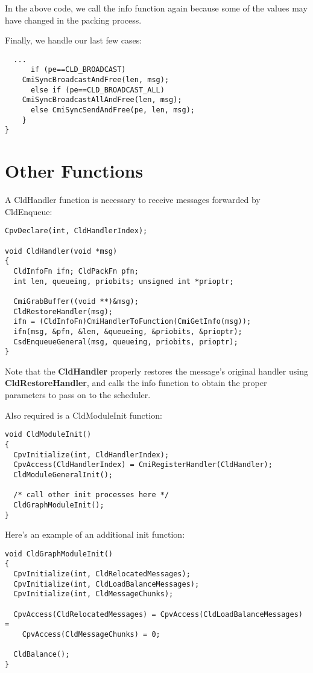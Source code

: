 \documentclass[11pt]{article}
\begin{document}
In the above code, we call the info function again because some of the
values may have changed in the packing process.  

Finally, we handle our last few cases:

\begin{verbatim}
  ...
      if (pe==CLD_BROADCAST) 
	CmiSyncBroadcastAndFree(len, msg);
      else if (pe==CLD_BROADCAST_ALL)
	CmiSyncBroadcastAllAndFree(len, msg);
      else CmiSyncSendAndFree(pe, len, msg);
    }
}
\end{verbatim}

\section{Other Functions}

A CldHandler function is necessary to receive messages forwarded by
CldEnqueue:

\begin{verbatim}
CpvDeclare(int, CldHandlerIndex);

void CldHandler(void *msg)
{
  CldInfoFn ifn; CldPackFn pfn;
  int len, queueing, priobits; unsigned int *prioptr;
  
  CmiGrabBuffer((void **)&msg);
  CldRestoreHandler(msg);
  ifn = (CldInfoFn)CmiHandlerToFunction(CmiGetInfo(msg));
  ifn(msg, &pfn, &len, &queueing, &priobits, &prioptr);
  CsdEnqueueGeneral(msg, queueing, priobits, prioptr);
}
\end{verbatim}

Note that the {\bf CldHandler} properly restores the message's original
handler using {\bf CldRestoreHandler}, and calls the info function to obtain
the proper parameters to pass on to the scheduler.

Also required is a CldModuleInit function:

\begin{verbatim}
void CldModuleInit()
{
  CpvInitialize(int, CldHandlerIndex);
  CpvAccess(CldHandlerIndex) = CmiRegisterHandler(CldHandler);
  CldModuleGeneralInit();

  /* call other init processes here */
  CldGraphModuleInit();
}
\end{verbatim}

Here's an example of an additional init function:

\begin{verbatim}
void CldGraphModuleInit()
{
  CpvInitialize(int, CldRelocatedMessages);
  CpvInitialize(int, CldLoadBalanceMessages);
  CpvInitialize(int, CldMessageChunks);

  CpvAccess(CldRelocatedMessages) = CpvAccess(CldLoadBalanceMessages) = 
    CpvAccess(CldMessageChunks) = 0;

  CldBalance();
}
\end{verbatim}
\end{document}
